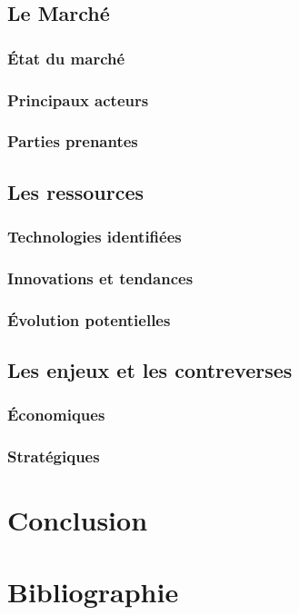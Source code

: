 \documentclass[11pt,a4paper,oneside]{book}
\begin{document}
\newpage

\section{Le Marché}

\subsection{État du marché}

\subsection{Principaux acteurs}

\subsection{Parties prenantes}

\newpage

\section{Les ressources}

\subsection{Technologies identifiées}

\subsection{Innovations et tendances}

\subsection{Évolution potentielles}

\newpage

\section{Les enjeux et les contreverses}

\subsection{Économiques}

\subsection{Stratégiques}


\chapter{Conclusion}


\chapter{Bibliographie}

\end{document}
